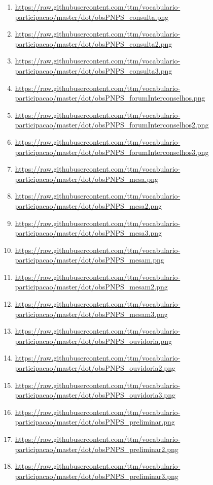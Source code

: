 \documentclass[12pt]{article}
\begin{document}
{\begin{enumerate}
    \item  \url{https://raw.githubusercontent.com/ttm/vocabulario-participacao/master/dot/obsPNPS_consulta.png}\label{i:76q}
    \item  \url{https://raw.githubusercontent.com/ttm/vocabulario-participacao/master/dot/obsPNPS_consulta2.png}\label{i:76r}
    \item  \url{https://raw.githubusercontent.com/ttm/vocabulario-participacao/master/dot/obsPNPS_consulta3.png}\label{i:76s}
    \item  \url{https://raw.githubusercontent.com/ttm/vocabulario-participacao/master/dot/obsPNPS_forumInterconselhos.png}\label{i:76t}
    \item  \url{https://raw.githubusercontent.com/ttm/vocabulario-participacao/master/dot/obsPNPS_forumInterconselhos2.png}\label{i:76u}
    \item  \url{https://raw.githubusercontent.com/ttm/vocabulario-participacao/master/dot/obsPNPS_forumInterconselhos3.png}\label{i:76v}
    \item  \url{https://raw.githubusercontent.com/ttm/vocabulario-participacao/master/dot/obsPNPS_mesa.png}\label{i:76x}
    \item  \url{https://raw.githubusercontent.com/ttm/vocabulario-participacao/master/dot/obsPNPS_mesa2.png}\label{i:76w}
    \item  \url{https://raw.githubusercontent.com/ttm/vocabulario-participacao/master/dot/obsPNPS_mesa3.png}\label{i:76z}
    \item  \url{https://raw.githubusercontent.com/ttm/vocabulario-participacao/master/dot/obsPNPS_mesam.png}\label{i:76aa}
    \item  \url{https://raw.githubusercontent.com/ttm/vocabulario-participacao/master/dot/obsPNPS_mesam2.png}\label{i:76bb}
    \item  \url{https://raw.githubusercontent.com/ttm/vocabulario-participacao/master/dot/obsPNPS_mesam3.png}\label{i:76cc}
    \item  \url{https://raw.githubusercontent.com/ttm/vocabulario-participacao/master/dot/obsPNPS_ouvidoria.png}\label{i:76dd}
    \item  \url{https://raw.githubusercontent.com/ttm/vocabulario-participacao/master/dot/obsPNPS_ouvidoria2.png}\label{i:76ee}
    \item  \url{https://raw.githubusercontent.com/ttm/vocabulario-participacao/master/dot/obsPNPS_ouvidoria3.png}\label{i:76ff}
    \item  \url{https://raw.githubusercontent.com/ttm/vocabulario-participacao/master/dot/obsPNPS_preliminar.png}\label{i:76gg}
    \item  \url{https://raw.githubusercontent.com/ttm/vocabulario-participacao/master/dot/obsPNPS_preliminar2.png}\label{i:76hh}
    \item  \url{https://raw.githubusercontent.com/ttm/vocabulario-participacao/master/dot/obsPNPS_preliminar3.png}\label{i:76ii}


\end{enumerate}}
\end{document}
